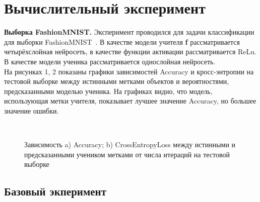 \newpage

\section{Вычислительный эксперимент}

\textbf{Выборка FashionMNIST.} Эксперимент проводился для задачи классификации для выборки FashionMNIST~\cite{FMNIST}. В качестве модели учителя \textbf{f} рассматривается четырёхслойная нейросеть, в качестве функции активации рассматривается ReLu. В качестве модели ученика рассматривается однослойная нейросеть.\\
На рисунках 1, 2 показаны графики зависимостей Accuracy и кросс-энтропии на тестовой выборке между истинными метками объектов и вероятностями, предсказанными моделью ученика. На графиках видно, что модель, использующая метки учителя, показывает лучшее значение Accuracy, но большее значение ошибки.

\begin{figure}[h!t]\center
{}
\\
\caption{Зависимость a) Accuracy; b) CrossEntropyLoss между истинными и предсказанными учеником метками от числа итераций на тестовой выборке}
\end{figure}


\newpage
\subsection{Базовый экперимент}